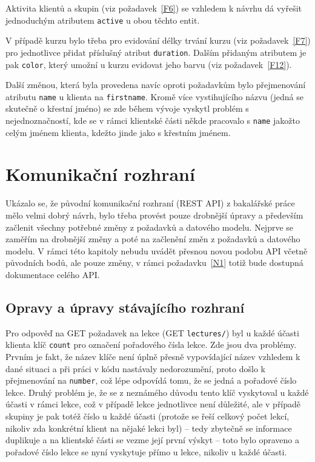 Aktivita klientů a skupin (viz požadavek~\ref{F6}) se vzhledem k návrhu dá vyřešit jednoduchým atributem \verb|active| u obou těchto entit.

V případě kurzu bylo třeba pro evidování délky trvání kurzu (viz požadavek~\ref{F7}) pro jednotlivce přidat příslušný atribut \verb|duration|. Dalším přidaným atributem je pak \verb|color|, který umožní u kurzu evidovat jeho barvu (viz požadavek~\ref{F12}).

Další změnou, která byla provedena navíc oproti požadavkům bylo přejmenování atributu \verb|name| u klienta na \verb|firstname|. Kromě více vystihujícího názvu (jedná se skutečně o křestní jméno) se zde během vývoje vyskytl problém s nejednoznačností, kde se v rámci klientské části někde pracovalo s \verb|name| jakožto celým jménem klienta, kdežto jinde jako s křestním jménem.

\section{Komunikační rozhraní}\label{sec:komunikacnirozhrani}

Ukázalo se, že původní komunikační rozhraní (REST API) z bakalářské práce mělo velmi dobrý návrh, bylo třeba provést pouze drobnější úpravy a především začlenit všechny potřebné změny z požadavků a datového modelu. Nejprve se zaměřím na drobnější změny a poté na začlenění změn z požadavků a datového modelu. V rámci této kapitoly nebudu uvádět přesnou novou podobu API včetně původních bodů, ale pouze změny, v rámci požadavku~\ref{N1} totiž bude dostupná dokumentace celého API.

\subsection{Opravy a úpravy stávajícího rozhraní}

Pro odpověď na GET požadavek na lekce (GET \verb|lectures/|) byl u každé účasti klienta klíč \verb|count| pro označení pořadového čísla lekce. Zde jsou dva problémy. Prvním je fakt, že název klíče není úplně přesně vypovídající název vzhledem k dané situaci a při práci v kódu nastávaly nedorozumění, proto došlo k přejmenování na \verb|number|, což lépe odpovídá tomu, že se jedná a pořadové číslo lekce. Druhý problém je, že se z neznámého důvodu tento klíč vyskytoval u každé účasti v rámci lekce, což v případě lekce jednotlivce není důležité, ale v případě skupiny je pak totéž číslo u každé účasti (protože se řeší celkový počet lekcí, nikoliv zda konkrétní klient na nějaké lekci byl) -- tedy zbytečně se informace duplikuje a na klientské části se vezme její první výskyt -- toto bylo opraveno a pořadové číslo lekce se nyní vyskytuje přímo u lekce, nikoliv u každé účasti.

